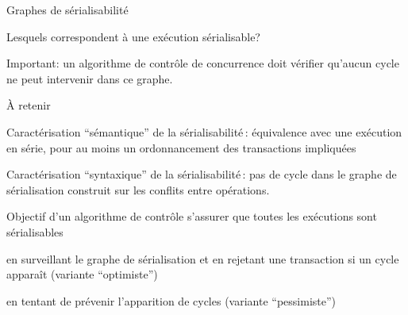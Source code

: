 \begin{frame}{Graphes de sérialisabilité}

Lesquels correspondent à une exécution sérialisable?

\vfill


\vfill

\begin{blocgauche}
\alert{Important}: un algorithme de contrôle de concurrence doit vérifier qu'aucun cycle ne peut intervenir
dans ce graphe.
\end{blocgauche}
\end{frame}

\begin{frame}{À retenir}

Caractérisation ``sémantique'' de la sérialisabilité\,: équivalence avec une exécution en série, pour au moins
un ordonnancement des transactions impliquées

\vfill

Caractérisation ``syntaxique'' de la sérialisabilité\,: pas de cycle dans le graphe de sérialisation
construit sur les conflits entre opérations.

\vfill

\alert{Objectif d'un algorithme de contrôle}\: s'assurer que toutes les exécutions sont sérialisables

\begin{blocgauche}
\begin{redbullet}
  \item en surveillant le graphe de sérialisation et en rejetant une transaction si un cycle apparaît (variante ``optimiste'')
  \item en tentant de prévenir l'apparition de cycles (variante ``pessimiste'')
\end{redbullet}
\end{blocgauche}

\end{frame}
